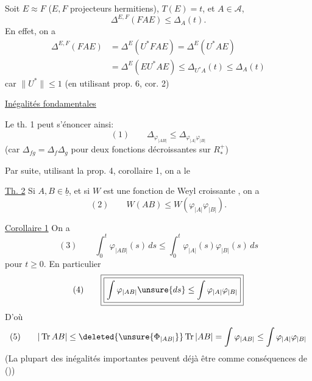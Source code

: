 \margin{$\Big|$}
Soit $E\approx F$ ($E,F$ projecteurs hermitiens), $T(E)=t$, et $A\in\mathcal A$, 
\[
\Delta^{E,F}(FAE)\leq\Delta_A(t).
\]
En effet, on a
\[
\begin{aligned}
\Delta^{E,F}(FAE)&=\Delta^E(U^*FAE)=\Delta^E(U^*AE)\\
&=\Delta^E(EU^*AE)\leq\Delta_{U^*A}(t)\leq\Delta_A(t)
\end{aligned}
\]
car $\|U^*\|\leq1$ (en utilisant prop. 6, cor. 2)

\uline{Inégalités fondamentales}

Le th. 1 peut s'énoncer ainsi:
\[
(1)\qquad\Delta_{\varphi_{|AB|}}\leq\Delta_{\varphi_{|A|}\varphi_{|B|}}
\]
(car $\Delta_{fg}=\Delta_f\Delta_g$ pour deux fonctions décroissantes sur  $R_*^+$)

Par suite, utilisant la prop. 4, corollaire 1, on a le

\uline{Th. 2} Si $A,B\in\underline b$,  et si $W$ est une fonction de Weyl croissante  , on a
\margin{$\Big|$}
\[
(2)\qquad W(AB)\leq W(\varphi_{|A|}\varphi_{|B|}).
\]

\uline{Corollaire 1} On a 
\margin{$\Big|$}
\[
(3)\qquad\int_0^t\varphi_{|AB|}(s)\,ds
\leq\int_0^t\varphi_{|A|}(s)\varphi_{|B|}(s)\,ds
\]
pour  $t\geq0$. En particulier
\[
(4)\qquad\boxed{\boxed{\int\varphi_{|AB|}\unsure{ds}\leq\int\varphi_{|A|}\varphi_{|B|}}}
\]
D'où
\[
(5)\qquad |\operatorname{Tr}AB|\leq\deleted{\unsure{\Phi_{|AB|}}}\operatorname{Tr}|AB|
=\int\varphi_{|AB|}\leq\int\varphi_{|A|}\varphi_{|B|}
\]
(La plupart des inégalités importantes peuvent déjà être  comme conséquences de ())

